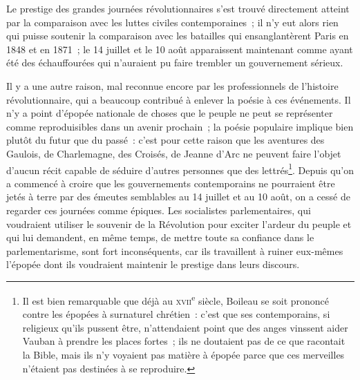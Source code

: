\documentclass[french,twoside]{book} %
\begin{document}
Le prestige des grandes journées révolutionnaires s’est trouvé directement atteint par la comparaison avec les luttes civiles contemporaines ; il n’y eut alors rien qui puisse soutenir la comparaison avec les batailles qui ensanglantèrent Paris en 1848 et en 1871 ; le 14 juillet et le 10 août apparaissent maintenant comme ayant été des échauffourées qui n’auraient pu faire trembler un gouvernement sérieux.\par
 Il y a une autre raison, mal reconnue encore par les professionnels de l’histoire révolutionnaire, qui a beaucoup contribué à enlever la poésie à ces événements. Il n’y a point d’épopée nationale de choses que le peuple ne peut se représenter comme reproduisibles dans un avenir prochain ; la poésie populaire implique bien plutôt du futur que du passé : c’est pour cette raison que les aventures des Gaulois, de Charlemagne, des Croisés, de Jeanne d’Arc ne peuvent faire l’objet d’aucun récit capable de séduire d’autres personnes que des lettrés\footnote{ \noindent Il est bien remarquable que déjà au {\scshape xvii}\textsuperscript{e} siècle, Boileau se soit prononcé contre les épopées à surnaturel chrétien : c’est que ses contemporains, si religieux qu’ils pussent être, n’attendaient point que des anges vinssent aider Vauban à prendre les places fortes ; ils ne doutaient pas de ce que racontait la Bible, mais ils n’y voyaient pas matière à épopée parce que ces merveilles n’étaient pas destinées à se reproduire.
 }. Depuis qu’on a commencé à croire que les gouvernements contemporains ne pourraient être jetés à terre par des émeutes semblables au 14 juillet et au 10 août, on a cessé de regarder ces journées comme épiques. Les socialistes parlementaires, qui voudraient utiliser le souvenir de la Révolution pour exciter l’ardeur du peuple et qui lui demandent, en même temps, de mettre toute sa confiance dans le parlementarisme, sont fort inconséquents, car ils travaillent à ruiner eux-mêmes l’épopée dont ils voudraient maintenir le prestige dans leurs discours.\par
\end{document}
